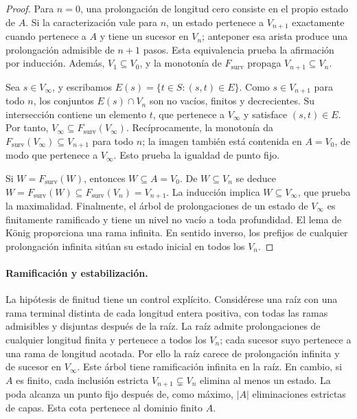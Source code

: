 \begin{proof}
Para \(n=0\), una prolongación de longitud cero consiste en el propio
estado de \(A\). Si la caracterización vale para \(n\), un estado pertenece
a \(V_{n+1}\) exactamente cuando pertenece a \(A\) y tiene un sucesor en
\(V_n\); anteponer esa arista produce una prolongación admisible de
\(n+1\) pasos. Esta equivalencia prueba la afirmación por inducción.
Además, \(V_1\subseteq V_0\), y la monotonía de
\(F_{\mathrm{surv}}\) propaga \(V_{n+1}\subseteq V_n\).

Sea \(s\in V_\infty\), y escribamos
\(E(s)=\{t\in S:(s,t)\in E\}\). Como \(s\in V_{n+1}\) para todo \(n\),
los conjuntos \(E(s)\cap V_n\) son no vacíos, finitos y decrecientes.
Su intersección contiene un elemento \(t\), que pertenece a
\(V_\infty\) y satisface \((s,t)\in E\). Por tanto,
\(V_\infty\subseteq F_{\mathrm{surv}}(V_\infty)\).
Recíprocamente, la monotonía da
\(F_{\mathrm{surv}}(V_\infty)\subseteq V_{n+1}\) para todo \(n\);
la imagen también está contenida en \(A=V_0\), de modo que pertenece a
\(V_\infty\). Esto prueba la igualdad de punto fijo.

Si \(W=F_{\mathrm{surv}}(W)\), entonces \(W\subseteq A=V_0\).
De \(W\subseteq V_n\) se deduce
\(W=F_{\mathrm{surv}}(W)\subseteq F_{\mathrm{surv}}(V_n)=V_{n+1}\).
La inducción implica \(W\subseteq V_\infty\), que prueba la maximalidad.
Finalmente, el árbol de prolongaciones de un estado de \(V_\infty\)
es finitamente ramificado y tiene un nivel no vacío a toda profundidad.
El lema de König proporciona una rama infinita. En sentido inverso, los
prefijos de cualquier prolongación infinita sitúan su estado inicial
en todos los \(V_n\).
\end{proof}

\paragraph{Ramificación y estabilización.}
La hipótesis de finitud tiene un control explícito. Considérese una raíz
con una rama terminal distinta de cada longitud entera positiva, con todas
las ramas admisibles y disjuntas después de la raíz. La raíz admite
prolongaciones de cualquier longitud finita y pertenece a todos los
\(V_n\); cada sucesor suyo pertenece a una rama de longitud acotada.
Por ello la raíz carece de prolongación infinita y de sucesor en
\(V_\infty\). Este árbol tiene ramificación infinita en la raíz.
En cambio, si \(A\) es finito, cada inclusión estricta
\(V_{n+1}\subsetneq V_n\) elimina al menos un estado. La poda alcanza
un punto fijo después de, como máximo, \(|A|\) eliminaciones estrictas
de capas. Esta cota pertenece al dominio finito \(A\).

